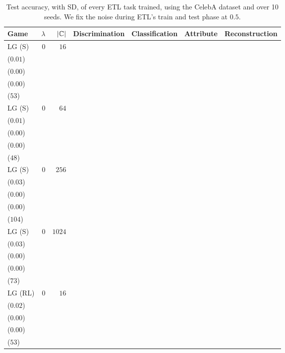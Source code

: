 \begin{table*}[t]
\linespread{0.6}\selectfont\centering
\centering
\caption{Test accuracy, with SD, of every ETL task trained, using the CelebA dataset and over 10 seeds. We fix the noise during ETL's train and test phase at \(0.5\).}
\label{table:etl_celeba_05_eval}
\begin{tabular}{lrrrrrr}
\toprule
Game & \(\lambda\) & \(|\mathcal{{\mathbb{C}}}|\) & \multicolumn{1}{c}{Discrimination} & \multicolumn{1}{c}{Classification} & \multicolumn{1}{c}{Attribute} & \multicolumn{1}{c}{Reconstruction} \\[1ex]
\midrule
LG {\scriptsize(S)} & \(0\) & \(16\) & \longcell{\(0.05\)\\{\tiny(\(0.01\))}} & \longcell{\(0.00\)\\{\tiny(\(0.00\))}} & \longcell{\(0.84\)\\{\tiny(\(0.00\))}} & \longcell{\(6291\)\\{\tiny(\(53\))}} \\[2.2ex]
LG {\scriptsize(S)} & \(0\) & \(64\) & \longcell{\(0.09\)\\{\tiny(\(0.01\))}} & \longcell{\(0.00\)\\{\tiny(\(0.00\))}} & \longcell{\(0.85\)\\{\tiny(\(0.00\))}} & \longcell{\(6184\)\\{\tiny(\(48\))}} \\[2.2ex]
LG {\scriptsize(S)} & \(0\) & \(256\) & \longcell{\(0.12\)\\{\tiny(\(0.03\))}} & \longcell{\(0.00\)\\{\tiny(\(0.00\))}} & \longcell{\(0.85\)\\{\tiny(\(0.00\))}} & \longcell{\(6107\)\\{\tiny(\(104\))}} \\[2.2ex]
LG {\scriptsize(S)} & \(0\) & \(1024\) & \longcell{\(0.13\)\\{\tiny(\(0.03\))}} & \longcell{\(0.00\)\\{\tiny(\(0.00\))}} & \longcell{\(0.84\)\\{\tiny(\(0.00\))}} & \longcell{\(6102\)\\{\tiny(\(73\))}} \\[2.2ex]
LG {\scriptsize(RL)} & \(0\) & \(16\) & \longcell{\(0.06\)\\{\tiny(\(0.02\))}} & \longcell{\(0.00\)\\{\tiny(\(0.00\))}} & \longcell{\(0.85\)\\{\tiny(\(0.00\))}} & \longcell{\(6210\)\\{\tiny(\(53\))}} \\[2.2ex]

\end{tabular}
\end{table*}
